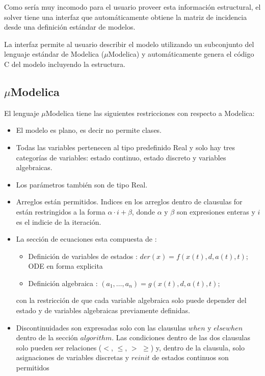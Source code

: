 \documentclass[a4paper,	11pt]{report}
\begin{document}
Como sería muy incomodo para el usuario proveer esta información estructural, el solver tiene una interfaz que automáticamente obtiene la matriz de incidencia desde una definición estándar de modelos.

La interfaz permite al usuario describir el modelo utilizando un subconjunto del lenguaje estándar de Modelica ($\mu$Modelica) y automáticamente genera el código C del modelo incluyendo la estructura.

\subsection{$\mu$Modelica}
El lenguaje $\mu$Modelica tiene las siguientes restricciones con respecto a Modelica:

\begin{itemize}
 \item El modelo es plano, es decir no permite clases.
 \item Todas las variables pertenecen al tipo predefinido Real y solo hay tres categorías de variables: estado continuo, estado discreto y variables algebraicas.
 \item Los parámetros también son de tipo Real. 
 \item Arreglos están permitidos. Indices en los arreglos dentro de clausulas for están restringidos a la forma $\alpha \cdot i + \beta$, donde $\alpha$ y $\beta$ son expresiones enteras y $i$ es el indicie de la iteración.
 \item La sección de ecuaciones esta compuesta de :
 \begin{itemize}
	\item Definición de variables de estados : $der(x) =  f (x(t), d, a(t), t);$ ODE en forma explicita
	\item Definición algebraica : $(a_1 , \dots , a_n ) = g(x(t), d, a(t), t);$
 \end{itemize}
 con la restricción de que cada variable algebraica solo puede depender del estado y de variables algebraicas previamente definidas.
 
 \item Discontinuidades son expresadas solo con las clausulas $when$ y $elsewhen$ dentro de la sección $algorithm$. Las condiciones dentro de las dos clausulas solo pueden ser relaciones ($<$, $\leqslant$, $>$ $\geqslant$) y, dentro de la clausula, solo asignaciones de variables discretas y $reinit$ de estados continuos son permitidos
\end{itemize}
\end{document}
